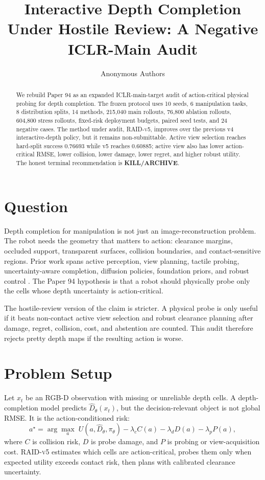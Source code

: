 \documentclass{article}
\title{Interactive Depth Completion Under Hostile Review: A Negative ICLR-Main Audit}
\author{Anonymous Authors}
\newcommand{\method}{\textsc{RAID-v5}}
\newcommand{\terminal}{\textsc{KILL/ARCHIVE}}
\begin{document}
\maketitle

\begin{abstract}
We rebuild Paper 94 as an expanded ICLR-main-target audit of action-critical physical probing for depth completion. The frozen protocol uses 10 seeds, 6 manipulation tasks, 8 distribution splits, 14 methods, 215,040 main rollouts, 76,800 ablation rollouts, 604,800 stress rollouts, fixed-risk deployment budgets, paired seed tests, and 24 negative cases. The method under audit, \method{}, improves over the previous v4 interactive-depth policy, but it remains non-submittable. Active view selection reaches hard-split success 0.76693 while v5 reaches 0.60885; active view also has lower action-critical RMSE, lower collision, lower damage, lower regret, and higher robust utility. The honest terminal recommendation is \textbf{\terminal}.
\end{abstract}

\section{Question}
Depth completion for manipulation is not just an image-reconstruction problem. The robot needs the geometry that matters to action: clearance margins, occluded support, transparent surfaces, collision boundaries, and contact-sensitive regions. Prior work spans active perception, view planning, tactile probing, uncertainty-aware completion, diffusion policies, foundation priors, and robust control \citep{r1048550arxiv190801238,r250401957v2,r101109cvpr52734202501596,r101109jsen20243488495,r101109icra20198793610,r101109jas2022105674,r260201939v3,r101007978303126889216,r230916778v1,r101109mrs60187202310416783}. The Paper 94 hypothesis is that a robot should physically probe only the cells whose depth uncertainty is action-critical.

The hostile-review version of the claim is stricter. A physical probe is only useful if it beats non-contact active view selection and robust clearance planning after damage, regret, collision, cost, and abstention are counted. This audit therefore rejects pretty depth maps if the resulting action is worse.

\section{Problem Setup}
Let $x_t$ be an RGB-D observation with missing or unreliable depth cells. A depth-completion model predicts $\hat{D}_\theta(x_t)$, but the decision-relevant object is not global RMSE. It is the action-conditioned risk:
\[
  a^\star = \arg\max_a \; U(a, \hat{D}_\theta, \pi_\theta) - \lambda_c C(a) - \lambda_d D(a) - \lambda_p P(a),
\]
where $C$ is collision risk, $D$ is probe damage, and $P$ is probing or view-acquisition cost. \method{} estimates which cells are action-critical, probes them only when expected utility exceeds contact risk, then plans with calibrated clearance uncertainty.
\end{document}
